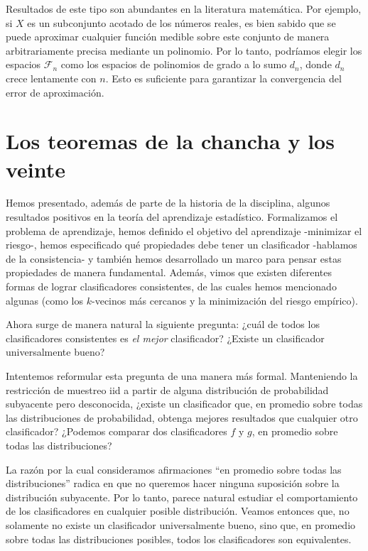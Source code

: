 \documentclass{report}
\begin{document}
Resultados de este tipo son abundantes en la literatura matemática. Por ejemplo, si \(X\) es un subconjunto 
acotado de los números reales, es bien sabido que se puede aproximar cualquier función medible sobre este 
conjunto de manera arbitrariamente precisa mediante un polinomio. Por lo tanto, podríamos elegir los espacios 
\(\mathcal{F}_n\) como los espacios de polinomios de grado a lo sumo \(d_n\), donde \(d_n\) crece lentamente 
con \(n\). Esto es suficiente para garantizar la convergencia del error de aproximación.\newline

\section{Los teoremas de la chancha y los veinte}

Hemos presentado, además de parte de la historia de la disciplina, algunos resultados positivos en la teoría del aprendizaje estadístico. 
Formalizamos el problema de aprendizaje, hemos definido el objetivo del aprendizaje -minimizar el 
riesgo-, hemos especificado qué propiedades debe tener un clasificador -hablamos de la consistencia- y también hemos desarrollado un 
marco para pensar estas propiedades de manera fundamental. Además, vimos que existen 
diferentes formas de lograr clasificadores consistentes, de las cuales hemos mencionado algunas (como los \(k\)-vecinos más cercanos y la 
minimización del riesgo empírico).\newline

Ahora surge de manera natural la siguiente pregunta: ¿cuál de todos los clasificadores consistentes 
es \textit{el mejor} clasificador? ¿Existe un clasificador universalmente bueno?\newline

Intentemos reformular esta pregunta de una manera más formal. Manteniendo la restricción de muestreo iid
a partir de alguna distribución de probabilidad subyacente pero desconocida, ¿existe 
un clasificador que, en promedio sobre todas las distribuciones de probabilidad, obtenga mejores 
resultados que cualquier otro clasificador? ¿Podemos comparar dos clasificadores \(f\) y \(g\), 
en promedio sobre todas las distribuciones?\newline

La razón por la cual consideramos afirmaciones ``en promedio sobre todas las distribuciones'' radica 
en que no queremos hacer ninguna suposición sobre la distribución subyacente. Por lo tanto, parece 
natural estudiar el comportamiento de los clasificadores en cualquier posible distribución. Veamos entonces
que, no solamente no existe un clasificador universalmente bueno, sino que, en promedio sobre todas las distribuciones
posibles, todos los clasificadores son equivalentes.\newline
\end{document}
